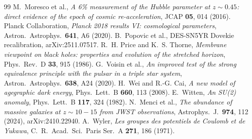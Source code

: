 \documentclass[11pt]{article}
\theoremstyle{definition}
\theoremstyle{remark}
\begin{document}
\begin{thebibliography}{99}
 M.~Moresco et al., \emph{A 6\% measurement of the Hubble parameter
at $z\sim0.45$: direct evidence of the epoch of cosmic re-acceleration}, JCAP
\textbf{05}, 014 (2016).
 Planck Collaboration, \emph{Planck 2018 results VI: cosmological
parameters}, Astron.\ Astrophys.\ \textbf{641}, A6 (2020).
 B.~Popovic et al., DES-SN5YR Dovekie recalibration,
arXiv:2511.07517.
 R.~H. Price and K.~S. Thorne, \emph{Membrane viewpoint on black holes:
properties and evolution of the stretched horizon}, Phys.\ Rev.\ D \textbf{33}, 915 (1986).
 G.~Voisin et al., \emph{An improved test of the strong equivalence
principle with the pulsar in a triple star system}, Astron.\ Astrophys.\ \textbf{638},
A24 (2020).
 H.~Wei and R.-G. Cai, \emph{A new model of agegraphic dark energy},
Phys.\ Lett.\ B \textbf{660}, 113 (2008).
 E.~Witten, \emph{An SU(2) anomaly}, Phys.\ Lett.\ B \textbf{117},
324 (1982).
 N.~Menci et al., \emph{The abundance of massive galaxies at $z\sim10-15$ from JWST observations}, Astrophys.\ J.\ \textbf{974}, 112 (2024), arXiv:2410.22940.
 A.~Wyler, \emph{Les groupes des potentiels de Coulomb et de Yukawa}, C.\ R.\ Acad.\ Sci.\ Paris Ser.\ A \textbf{271}, 186 (1971).
\end{thebibliography}
\end{document}
